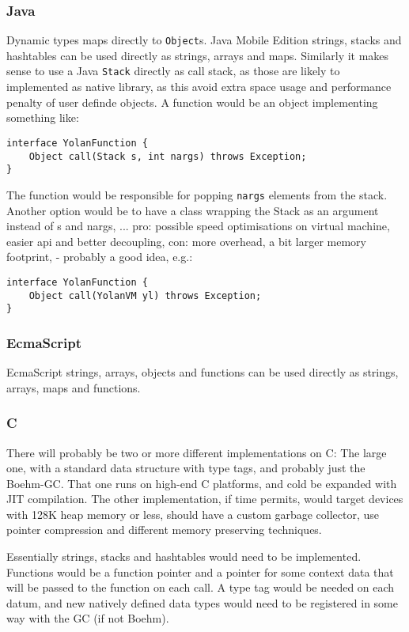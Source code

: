 \subsubsection{Java}
Dynamic types maps directly to \verb|Object|s. Java Mobile Edition strings, stacks and hashtables can be used directly as strings, arrays and maps. 
Similarly it makes sense to use a Java \verb|Stack| directly as call stack, as those are likely to implemented as native library, as this avoid extra space usage and performance penalty of user definde objects.
A function would be an object implementing something like:
\begin{verbatim}
interface YolanFunction {
    Object call(Stack s, int nargs) throws Exception;
}
\end{verbatim}
The function would be responsible for popping \verb|nargs| elements from the stack. Another option would be to have a class wrapping the Stack as an argument instead of s and nargs, ... pro: possible speed optimisations on virtual machine, easier api and better decoupling, con: more overhead, a bit larger memory footprint, - probably a good idea, e.g.:
\begin{verbatim}
interface YolanFunction {
    Object call(YolanVM yl) throws Exception;
}
\end{verbatim}

\subsubsection{EcmaScript}
EcmaScript strings, arrays, objects and functions can be used directly as strings, arrays, maps and functions.

\subsubsection{C}
There will probably be two or more different implementations on C: The large one, with a standard data structure with type tags, and probably just the Boehm-GC. That one runs on high-end C platforms, and cold be expanded with JIT compilation. The other implementation, if time permits, would target devices with 128K heap memory or less, should have a custom garbage collector, use pointer compression and different memory preserving techniques.

Essentially strings, stacks and hashtables would need to be implemented. Functions would be a function pointer and a pointer for some context data that will be passed to the function on each call. A type tag would be needed on each datum, and new natively defined data types would need to be registered in some way with the GC (if not Boehm).

